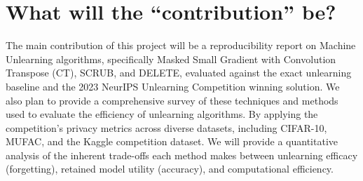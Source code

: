 \documentclass[12pt]{article}
\begin{document}
\section{What will the “contribution” be?}
The main contribution of this project will be a reproducibility report on Machine Unlearning algorithms, specifically Masked Small Gradient with Convolution Transpose (CT), SCRUB, and DELETE, evaluated against the exact unlearning baseline and the 2023 NeurIPS Unlearning Competition winning solution. We also plan to provide a comprehensive survey of these techniques and methods used to evaluate the efficiency of unlearning algorithms. By applying the competition's privacy metrics across diverse datasets, including CIFAR-10, MUFAC, and the Kaggle competition dataset. We will provide a quantitative analysis of the inherent trade-offs each method makes between unlearning efficacy (forgetting), retained model utility (accuracy), and computational efficiency.
\printbibliography
\end{document}
